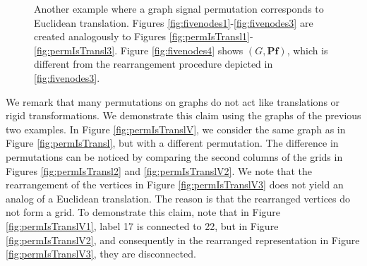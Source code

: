 \documentclass{article}
\def\BP{\boldsymbol{P}}
\def\Bf{\boldsymbol{f}}
\begin{document}
\begin{figure}[!ht]
\caption{Another example where a graph signal permutation corresponds to Euclidean translation. Figures \ref{fig:fivenodes1}-\ref{fig:fivenodes3} are created analogously to Figures \ref{fig:permIsTransl1}-\ref{fig:permIsTransl3}. Figure \ref{fig:fivenodes4} shows $(G, \BP \Bf)$, which is different from the rearrangement procedure depicted in \ref{fig:fivenodes3}.}
\label{fig:fivenodes}
\end{figure}

{We remark that many permutations on graphs do not act like translations or rigid transformations. We demonstrate this claim using the graphs of the previous two examples. In Figure \ref{fig:permIsTranslV}, we consider the same graph as in Figure \ref{fig:permIsTransl}, but with a different permutation. The difference in permutations can be noticed by comparing the second columns of the grids in Figures \ref{fig:permIsTransl2} and \ref{fig:permIsTranslV2}. We note that the rearrangement of the vertices in Figure \ref{fig:permIsTranslV3} does not yield an analog of a Euclidean translation. The reason is that the rearranged  vertices do not form a grid. To demonstrate this claim, note that in Figure \ref{fig:permIsTranslV1}, label 17 is connected to 22, but in Figure \ref{fig:permIsTranslV2}, and consequently in the rearranged representation in Figure \ref{fig:permIsTranslV3}, they are disconnected.}
\end{document}
